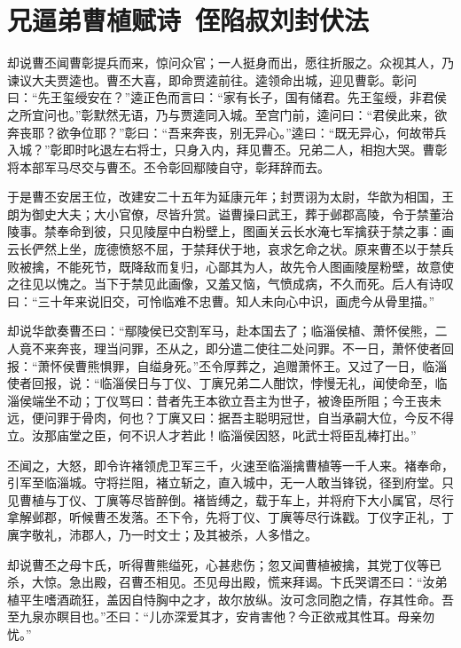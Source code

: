 \chapter{兄逼弟曹植赋诗~侄陷叔刘封伏法}

却说曹丕闻曹彰提兵而来，惊问众官；一人挺身而出，愿往折服之。众视其人，乃谏议大夫贾逵也。曹丕大喜，即命贾逵前往。逵领命出城，迎见曹彰。彰问曰：“先王玺绶安在？”逵正色而言曰：“家有长子，国有储君。先王玺绶，非君侯之所宜问也。”彰默然无语，乃与贾逵同入城。至宫门前，逵问曰：“君侯此来，欲奔丧耶？欲争位耶？”彰曰：“吾来奔丧，别无异心。”逵曰：“既无异心，何故带兵入城？”彰即时叱退左右将士，只身入内，拜见曹丕。兄弟二人，相抱大哭。曹彰将本部军马尽交与曹丕。丕令彰回鄢陵自守，彰拜辞而去。

于是曹丕安居王位，改建安二十五年为延康元年；封贾诩为太尉，华歆为相国，王朗为御史大夫；大小官僚，尽皆升赏。谥曹操曰武王，葬于邺郡高陵，令于禁董治陵事。禁奉命到彼，只见陵屋中白粉壁上，图画关云长水淹七军擒获于禁之事：画云长俨然上坐，庞德愤怒不屈，于禁拜伏于地，哀求乞命之状。原来曹丕以于禁兵败被擒，不能死节，既降敌而复归，心鄙其为人，故先令人图画陵屋粉壁，故意使之往见以愧之。当下于禁见此画像，又羞又恼，气愤成病，不久而死。后人有诗叹曰：“三十年来说旧交，可怜临难不忠曹。知人未向心中识，画虎今从骨里描。”

却说华歆奏曹丕曰：“鄢陵侯已交割军马，赴本国去了；临淄侯植、萧怀侯熊，二人竟不来奔丧，理当问罪，丕从之，即分遣二使往二处问罪。不一日，萧怀使者回报：“萧怀侯曹熊惧罪，自缢身死。”丕令厚葬之，追赠萧怀王。又过了一日，临淄使者回报，说：“临淄侯日与丁仪、丁廙兄弟二人酣饮，悖慢无礼，闻使命至，临淄侯端坐不动；丁仪骂曰：昔者先王本欲立吾主为世子，被谗臣所阻；今王丧未远，便问罪于骨肉，何也？丁廙又曰：据吾主聪明冠世，自当承嗣大位，今反不得立。汝那庙堂之臣，何不识人才若此！临淄侯因怒，叱武士将臣乱棒打出。”

丕闻之，大怒，即令许褚领虎卫军三千，火速至临淄擒曹植等一千人来。褚奉命，引军至临淄城。守将拦阻，褚立斩之，直入城中，无一人敢当锋锐，径到府堂。只见曹植与丁仪、丁廙等尽皆醉倒。褚皆缚之，载于车上，并将府下大小属官，尽行拿解邺郡，听候曹丕发落。丕下令，先将丁仪、丁廙等尽行诛戳。丁仪字正礼，丁廙字敬礼，沛郡人，乃一时文士；及其被杀，人多惜之。

却说曹丕之母卞氏，听得曹熊缢死，心甚悲伤；忽又闻曹植被擒，其党丁仪等已杀，大惊。急出殿，召曹丕相见。丕见母出殿，慌来拜谒。卞氏哭谓丕曰：“汝弟植平生嗜酒疏狂，盖因自恃胸中之才，故尔放纵。汝可念同胞之情，存其性命。吾至九泉亦瞑目也。”丕曰：“儿亦深爱其才，安肯害他？今正欲戒其性耳。母亲勿忧。”

